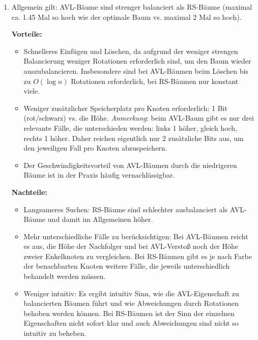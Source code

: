 \documentclass[11pt,a4paper]{article}
\begin{document}
\begin{loesung}
    \begin{enumerate}[label=\alph*)]
        \item
        Allgemein gilt: AVL-Bäume sind strenger balanciert als RS-Bäume (maximal ca. 1.45 Mal so hoch wie der optimale Baum vs. maximal 2 Mal so hoch).

        \textbf{Vorteile:}
        \begin{itemize}
            \item Schnelleres Einfügen und Löschen, da aufgrund der weniger strengen Balancierung weniger Rotationen erforderlich sind, um den Baum wieder auszubalancieren.
            Insbesondere sind bei AVL-Bäumen beim Löschen bis zu $O(\log n)$ Rotationen erforderlich, bei RS-Bäumen nur konstant viele.
            \item Weniger zusätzlicher Speicherplatz pro Knoten erforderlich: 1 Bit (rot/schwarz) vs. die Höhe. \newline
            \emph{Anmerkung}: beim AVL-Baum gibt es nur drei relevante Fälle, die unterschieden werden: links 1 höher, gleich hoch, rechts 1 höher.
            Daher reichen eigentlich nur 2 zusätzliche Bits aus, um den jeweiligen Fall pro Knoten abzuspeichern.
            \item Der Geschwindigkeitsvorteil von AVL-Bäumen durch die niedrigeren Bäume ist in der Praxis häufig vernachlässigbar.
        \end{itemize}
        \textbf{Nachteile:}
        \begin{itemize}
            \item Langsameres Suchen: RS-Bäume sind schlechter ausbalanciert als AVL-Bäume und damit im Allgemeinen höher.

            \item Mehr unterschiedliche Fälle zu berücksichtigen:
            Bei AVL-Bäumen reicht es aus, die Höhe der Nachfolger und bei AVL-Verstoß noch der Höhe zweier Enkelknoten zu vergleichen.
            Bei RS-Bäumen gibt es je nach Farbe der benachbarten Knoten  weitere Fälle, die jeweils unterschiedlich behandelt werden müssen.

            \item Weniger intuitiv: Es ergibt intuitiv Sinn, wie die AVL-Eigenschaft zu balancierten Bäumen führt und wie Abweichungen durch Rotationen behoben werden können.
            Bei RS-Bäumen ist der Sinn der einzelnen Eigenschaften nicht sofort klar und auch Abweichungen sind nicht so intuitiv zu beheben.
        \end{itemize}
    

\end{enumerate}
\end{loesung}
\end{document}
